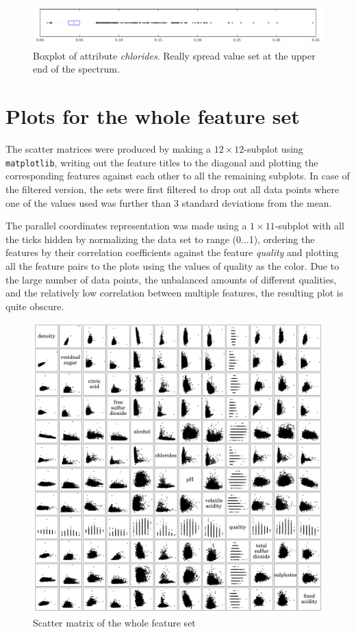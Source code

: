 \documentclass{report}
\begin{document}
\begin{figure}[H]
\includegraphics[width=\textwidth]{boxplots/chlorides.pdf}
\caption{Boxplot of attribute \emph{chlorides}. Really spread value set at the upper end of the spectrum.}\end{figure}

\newpage
\section{Plots for the whole feature set}
The scatter matrices were produced by making a $12\times 12$-subplot using \texttt{matplotlib}, writing out the feature titles to the diagonal and plotting the corresponding features against each other to all the remaining subplots. In case of the filtered version, the sets were first filtered to drop out all data points where one of the values used was further than 3 standard deviations from the mean.

The parallel coordinates representation was made using a $1\times 11$-subplot with all the ticks hidden by normalizing the data set to range (0...1), ordering the features by their correlation coefficients against the feature \textit{quality} and plotting all the feature pairs to the plots using the values of quality as the color. Due to the large number of data points, the unbalanced amounts of different qualities, and the relatively low correlation between multiple features, the resulting plot is quite obscure.

\begin{figure}[H]
\includegraphics[width=\textwidth]{scattermatrix.png}
\caption{Scatter matrix of the whole feature set}
\end{figure}
\end{document}
